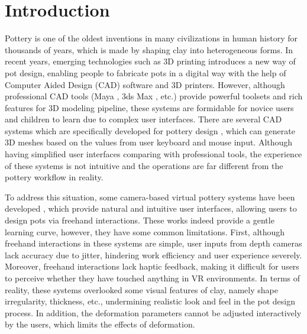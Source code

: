 \documentclass{svjour3}                     %
\begin{document}

\section{Introduction}
\label{sec:1}
Pottery is one of the oldest inventions in many civilizations in human history for thousands of years, which is made by shaping clay into heterogeneous forms.
In recent years, emerging technologies such as 3D printing introduces a new way of pot design, enabling people to fabricate pots in a digital way with the help of Computer Aided Design (CAD) software and 3D printers.
However, although professional CAD tools (Maya \cite{website:maya}, 3ds Max \cite{website:3dmax}, etc.) provide powerful toolsets and rich features for 3D modeling pipeline, these systems are formidable for novice users and children to learn due to complex user interfaces.
There are several CAD systems which are specifically developed for pottery design \cite{koutsoudis2009qp,kumar2011wheel}, which can generate 3D meshes based on the values from user keyboard and mouse input. Although having simplified user interfaces comparing with professional tools, the experience of these systems is not intuitive and the operations are far different from the pottery workflow in reality.

To address this situation, some camera-based virtual pottery systems have been developed \cite{ramani2015gesture,murugappan2013handy,han2014virtual}, which provide natural and intuitive user interfaces, allowing users to design pots via freehand interactions.
These works indeed provide a gentle learning curve, however, they have some common limitations.
First, although freehand interactions in these systems are simple, user inputs from depth cameras lack accuracy due to jitter, hindering work efficiency and user experience severely.
%
Moreover, freehand interactions lack haptic feedback, making it difficult for users to perceive whether they have touched anything in VR environments. In terms of reality, these systems overlooked some visual features of clay, namely shape irregularity, thickness, etc., undermining realistic look and feel in the pot design process.
%
In addition, the deformation parameters cannot be adjusted interactively by the users, which limits the effects of deformation.
\end{document}
